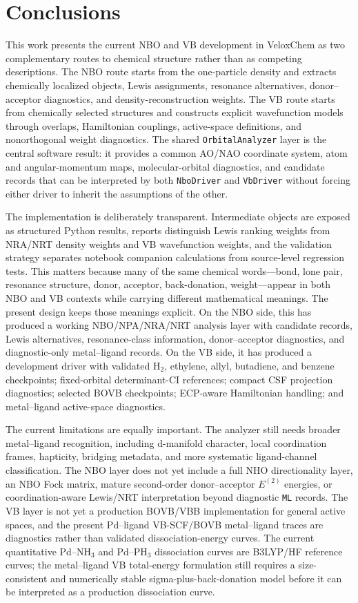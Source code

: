 \documentclass[11pt]{article}
\begin{document}
\section{Conclusions}

This work presents the current NBO and VB development in VeloxChem as two complementary routes to chemical structure rather than as competing descriptions.  The NBO route starts from the one-particle density and extracts chemically localized objects, Lewis assignments, resonance alternatives, donor--acceptor diagnostics, and density-reconstruction weights.  The VB route starts from chemically selected structures and constructs explicit wavefunction models through overlaps, Hamiltonian couplings, active-space definitions, and nonorthogonal weight diagnostics.  The shared \texttt{OrbitalAnalyzer} layer is the central software result: it provides a common AO/NAO coordinate system, atom and angular-momentum maps, molecular-orbital diagnostics, and candidate records that can be interpreted by both \texttt{NboDriver} and \texttt{VbDriver} without forcing either driver to inherit the assumptions of the other.

The implementation is deliberately transparent.  Intermediate objects are exposed as structured Python results, reports distinguish Lewis ranking weights from NRA/NRT density weights and VB wavefunction weights, and the validation strategy separates notebook companion calculations from source-level regression tests.  This matters because many of the same chemical words---bond, lone pair, resonance structure, donor, acceptor, back-donation, weight---appear in both NBO and VB contexts while carrying different mathematical meanings.  The present design keeps those meanings explicit.  On the NBO side, this has produced a working NBO/NPA/NRA/NRT analysis layer with candidate records, Lewis alternatives, resonance-class information, donor--acceptor diagnostics, and diagnostic-only metal--ligand records.  On the VB side, it has produced a development driver with validated H$_2$, ethylene, allyl, butadiene, and benzene checkpoints; fixed-orbital determinant-CI references; compact CSF projection diagnostics; selected BOVB checkpoints; ECP-aware Hamiltonian handling; and metal--ligand active-space diagnostics.

The current limitations are equally important.  The analyzer still needs broader metal--ligand recognition, including d-manifold character, local coordination frames, hapticity, bridging metadata, and more systematic ligand-channel classification.  The NBO layer does not yet include a full NHO directionality layer, an NBO Fock matrix, mature second-order donor--acceptor $E^{(2)}$ energies, or coordination-aware Lewis/NRT interpretation beyond diagnostic \texttt{ML} records.  The VB layer is not yet a production BOVB/VBB implementation for general active spaces, and the present Pd--ligand VB-SCF/BOVB metal--ligand traces are diagnostics rather than validated dissociation-energy curves.  The current quantitative Pd--NH$_3$ and Pd--PH$_3$ dissociation curves are B3LYP/HF reference curves; the metal--ligand VB total-energy formulation still requires a size-consistent and numerically stable sigma-plus-back-donation model before it can be interpreted as a production dissociation curve.
\end{document}
